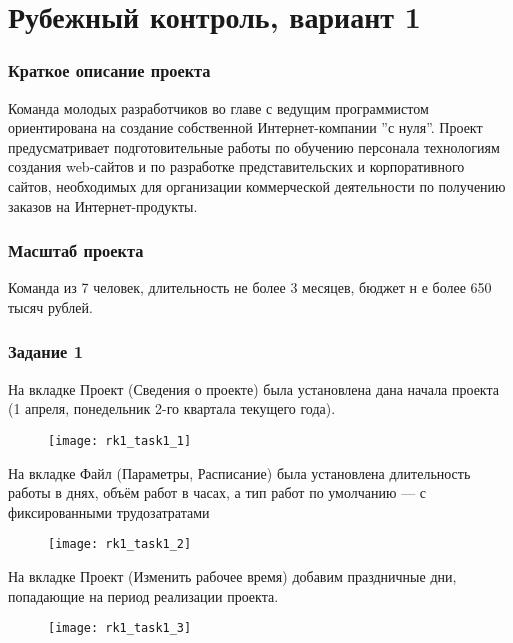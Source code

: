 \chapter{Рубежный контроль, вариант 1}

\subsection*{Краткое описание проекта}

Команда молодых разработчиков во главе с ведущим программистом ориентирована на создание собственной Интернет-компании ''с нуля''. Проект предусматривает подготовительные работы по обучению персонала технологиям создания web-сайтов и по разработке представительских и корпоративного сайтов, необходимых для организации коммерческой деятельности по получению заказов на Интернет-продукты.

\subsection*{Масштаб проекта}

Команда из 7 человек, длительность не более 3 месяцев, бюджет н е более 650 тысяч рублей.


\subsection*{Задание 1}

На вкладке Проект (Сведения о проекте) была установлена дана начала проекта (1 апреля, понедельник 2-го квартала текущего года).

\begin{figure}[h!]
	\texttt{[image: rk1\_task1\_1]}
\end{figure}

\clearpage

На вкладке Файл (Параметры, Расписание) была установлена длительность работы в днях, объём работ в часах, а тип работ по умолчанию --- с фиксированными трудозатратами

\begin{figure}[h!]
	\texttt{[image: rk1\_task1\_2]}
\end{figure}

На вкладке Проект (Изменить рабочее время) добавим праздничные дни, попадающие на период реализации проекта.

\begin{figure}[h!]
	\texttt{[image: rk1\_task1\_3]}
\end{figure}

